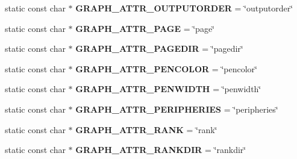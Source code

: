 \begin{DoxyCompactItemize}
\item 
static const char $\ast$ {\bfseries G\+R\+A\+P\+H\+\_\+\+A\+T\+T\+R\+\_\+\+O\+U\+T\+P\+U\+T\+O\+R\+D\+ER} = \char`\"{}outputorder\char`\"{}\hypertarget{classmemgraph_1_1_graphviz_attrs_a0b6b1007d003bd6ae6eec44af4fa741c}{}\label{classmemgraph_1_1_graphviz_attrs_a0b6b1007d003bd6ae6eec44af4fa741c}

\item 
static const char $\ast$ {\bfseries G\+R\+A\+P\+H\+\_\+\+A\+T\+T\+R\+\_\+\+P\+A\+GE} = \char`\"{}page\char`\"{}\hypertarget{classmemgraph_1_1_graphviz_attrs_a0f2d3c8e672e14c9dccb0c92ee43afab}{}\label{classmemgraph_1_1_graphviz_attrs_a0f2d3c8e672e14c9dccb0c92ee43afab}

\item 
static const char $\ast$ {\bfseries G\+R\+A\+P\+H\+\_\+\+A\+T\+T\+R\+\_\+\+P\+A\+G\+E\+D\+IR} = \char`\"{}pagedir\char`\"{}\hypertarget{classmemgraph_1_1_graphviz_attrs_a86b3e4c71031f87b539281f1265f096d}{}\label{classmemgraph_1_1_graphviz_attrs_a86b3e4c71031f87b539281f1265f096d}

\item 
static const char $\ast$ {\bfseries G\+R\+A\+P\+H\+\_\+\+A\+T\+T\+R\+\_\+\+P\+E\+N\+C\+O\+L\+OR} = \char`\"{}pencolor\char`\"{}\hypertarget{classmemgraph_1_1_graphviz_attrs_ae508397611779d9dd0b13adb40f7f2f2}{}\label{classmemgraph_1_1_graphviz_attrs_ae508397611779d9dd0b13adb40f7f2f2}

\item 
static const char $\ast$ {\bfseries G\+R\+A\+P\+H\+\_\+\+A\+T\+T\+R\+\_\+\+P\+E\+N\+W\+I\+D\+TH} = \char`\"{}penwidth\char`\"{}\hypertarget{classmemgraph_1_1_graphviz_attrs_a2e4d7941d2651070bef4d3adf5d2416c}{}\label{classmemgraph_1_1_graphviz_attrs_a2e4d7941d2651070bef4d3adf5d2416c}

\item 
static const char $\ast$ {\bfseries G\+R\+A\+P\+H\+\_\+\+A\+T\+T\+R\+\_\+\+P\+E\+R\+I\+P\+H\+E\+R\+I\+ES} = \char`\"{}peripheries\char`\"{}\hypertarget{classmemgraph_1_1_graphviz_attrs_ae521de76269433e4ebe9c3298590112a}{}\label{classmemgraph_1_1_graphviz_attrs_ae521de76269433e4ebe9c3298590112a}

\item 
static const char $\ast$ {\bfseries G\+R\+A\+P\+H\+\_\+\+A\+T\+T\+R\+\_\+\+R\+A\+NK} = \char`\"{}rank\char`\"{}\hypertarget{classmemgraph_1_1_graphviz_attrs_acbe0bc92ffc492b4e8996c6c0df6d059}{}\label{classmemgraph_1_1_graphviz_attrs_acbe0bc92ffc492b4e8996c6c0df6d059}

\item 
static const char $\ast$ {\bfseries G\+R\+A\+P\+H\+\_\+\+A\+T\+T\+R\+\_\+\+R\+A\+N\+K\+D\+IR} = \char`\"{}rankdir\char`\"{}\hypertarget{classmemgraph_1_1_graphviz_attrs_aed14a6b1253d82534ccbc5b1a41db111}{}\label{classmemgraph_1_1_graphviz_attrs_aed14a6b1253d82534ccbc5b1a41db111}


\end{DoxyCompactItemize}
